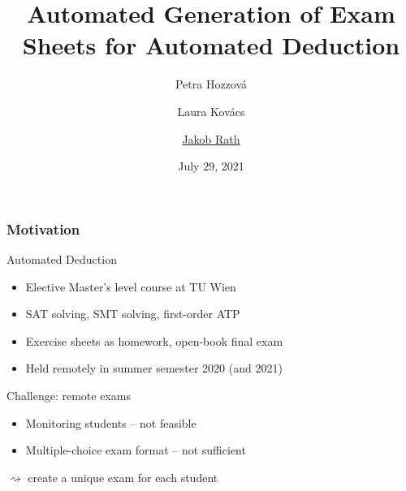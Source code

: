 \documentclass[xcolor={table}]{beamer}
\title{Automated Generation of Exam Sheets for Automated Deduction} %
\author{
    Petra Hozzov\'a
    \and
    Laura Kov\'acs
    \and
    \texorpdfstring{\underline{Jakob Rath}}{Jakob Rath}
}
\institute{
Vienna University of Technology%
}
\date{\vspace*{-3em}\small July 29, 2021} %
\begin{document}
\begin{frame}[plain]
\titlepage %
\end{frame}
\addtocounter{framenumber}{-1}



\begin{frame}
\frametitle{Motivation}

    \begin{block}{Automated Deduction}
        \begin{itemize}
            \item Elective Master's level course at TU Wien
            \item SAT solving, SMT solving, first-order ATP
            \item Exercise sheets as homework, open-book final exam
            \item Held remotely in summer semester 2020 (and 2021)
        \end{itemize}
    \end{block}



    \medskip
    \pause

    \begin{alertblock}{Challenge: remote exams}
        \begin{itemize}
            \item Monitoring students -- not feasible
            \item Multiple-choice exam format -- not sufficient
        \end{itemize}
    \end{alertblock}
    \pause
    \vspace*{1em}
    \qquad $\rightsquigarrow$ create a unique exam for each student
\end{frame}
\end{document}
